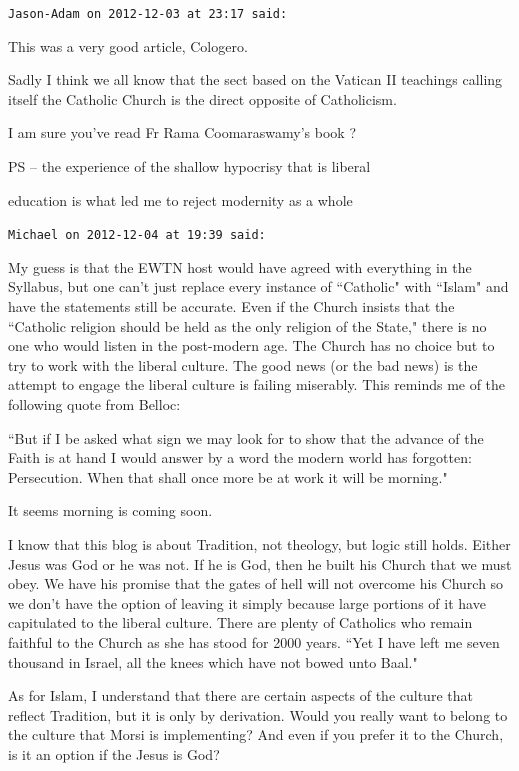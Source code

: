 \begin{footnotesize}\begin{sffamily}



\texttt{Jason-Adam on 2012-12-03 at 23:17 said: }

This was a very good article, Cologero. 

Sadly I think we all know that the sect based on the Vatican II teachings calling itself the Catholic Church is the direct opposite of Catholicism.

I am sure you've read Fr Rama Coomaraswamy's book ? 

PS – the experience of the shallow hypocrisy that is liberal

education is what led me to reject modernity as a whole


\hfill

\texttt{Michael on 2012-12-04 at 19:39 said: }

My guess is that the EWTN host would have agreed with everything in the Syllabus, but one can't just replace every instance of ``Catholic" with ``Islam" and have the statements still be accurate. Even if the Church insists that the ``Catholic religion should be held as the only religion of the State," there is no one who would listen in the post-modern age. The Church has no choice but to try to work with the liberal culture. The good news (or the bad news) is the attempt to engage the liberal culture is failing miserably. This reminds me of the following quote from Belloc:

``But if I be asked what sign we may look for to show that the advance of the Faith is at hand I would answer by a word the modern world has forgotten: Persecution. When that shall once more be at work it will be morning."

It seems morning is coming soon.

I know that this blog is about Tradition, not theology, but logic still holds. Either Jesus was God or he was not. If he is God, then he built his Church that we must obey. We have his promise that the gates of hell will not overcome his Church so we don't have the option of leaving it simply because large portions of it have capitulated to the liberal culture. There are plenty of Catholics who remain faithful to the Church as she has stood for 2000 years. ``Yet I have left me seven thousand in Israel, all the knees which have not bowed unto Baal."

As for Islam, I understand that there are certain aspects of the culture that reflect Tradition, but it is only by derivation. Would you really want to belong to the culture that Morsi is implementing? And even if you prefer it to the Church, is it an option if the Jesus is God?



\end{sffamily}
\end{footnotesize}
